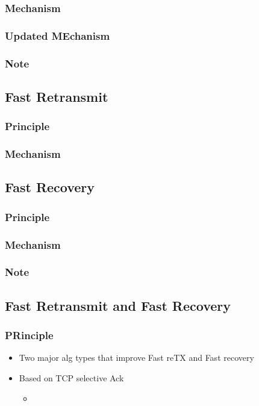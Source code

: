 \documentclass[a4paper]{article}
\begin{document}
\subsubsection{Mechanism}
\subsubsection{Updated MEchanism}
\subsubsection{Note}
\subsection{Fast Retransmit}
\subsubsection{Principle}
\subsubsection{Mechanism}
\subsection{Fast Recovery}
\subsubsection{Principle}
\subsubsection{Mechanism}
\subsubsection{Note}
\subsection{Fast Retransmit and Fast Recovery}
\subsubsection{PRinciple}
\begin{itemize}
	\item Two major alg types that improve Fast reTX and Fast recovery
	\item Based on TCP selective Ack
	\begin{itemize}
		\item
	\end{itemize}

\end{itemize}
\end{document}
